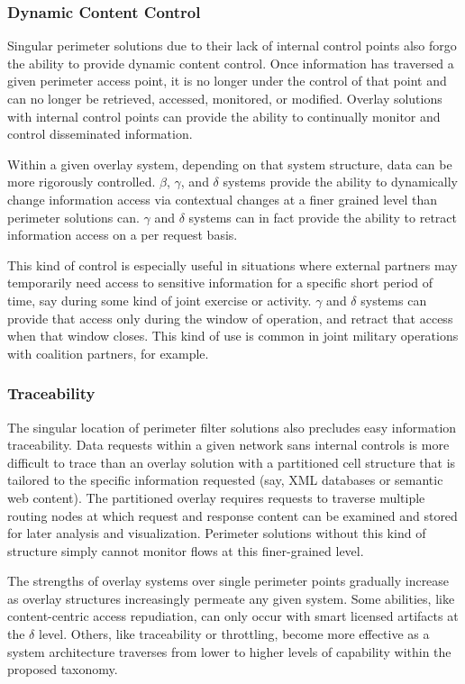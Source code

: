 \subsubsection*{Dynamic Content Control}
Singular perimeter solutions due to their lack of internal control points also forgo the ability to provide dynamic content control.  Once information has traversed a given perimeter access point, it is no longer under the control of that point and can no longer be retrieved, accessed, monitored, or modified.  Overlay solutions with internal control points can provide the ability to continually monitor and control disseminated information.

Within a given overlay system, depending on that system structure, data can be more rigorously controlled.  $\beta$, $\gamma$, and $\delta$ systems provide the ability to dynamically change information access via contextual changes at a finer grained level than perimeter solutions can.  $\gamma$ and $\delta$ systems can in fact provide the ability to retract information access on a per request basis.

This kind of control is especially useful in situations where external partners may temporarily need access to sensitive information for a specific short period of time, say during some kind of joint exercise or activity.  $\gamma$ and $\delta$ systems can provide that access only during the window of operation, and retract that access when that window closes.  This kind of use is common in joint military operations with coalition partners, for example.

\subsubsection*{Traceability}
The singular location of perimeter filter solutions also precludes easy information traceability.  Data requests within a given network sans internal controls is more difficult to trace than an overlay solution with a partitioned cell structure that is tailored to the specific information requested (say, XML databases or semantic web content).  The partitioned overlay requires requests to traverse multiple routing nodes at which request and response content can be examined and stored for later analysis and visualization.  Perimeter solutions without this kind of structure simply cannot monitor flows at this finer-grained level.

The strengths of overlay systems over single perimeter points gradually increase as overlay structures increasingly permeate any given system.  Some abilities, like content-centric access repudiation, can only occur with smart licensed artifacts at the $\delta$ level.  Others, like traceability or throttling, become more effective as a system architecture traverses from lower to higher levels of capability within the proposed taxonomy.
